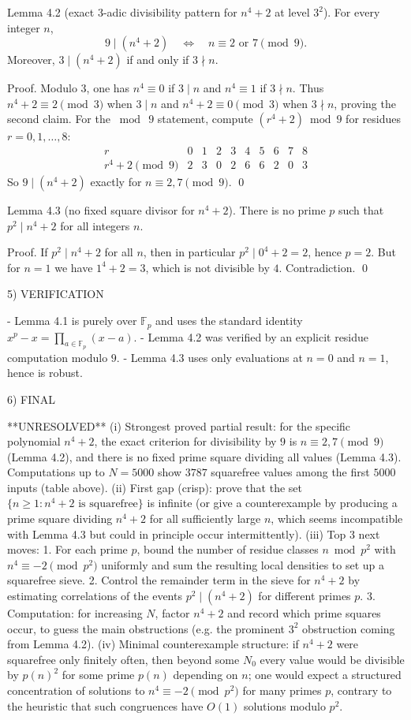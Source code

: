 Lemma 4.2 (exact $3$-adic divisibility pattern for $n^4+2$ at level $3^2$).
For every integer $n$,
\[
9\mid (n^4+2)\quad\Longleftrightarrow\quad n\equiv 2\text{ or }7\pmod 9.
\]
Moreover, $3\mid(n^4+2)$ if and only if $3\nmid n$.

Proof.
Modulo $3$, one has $n^4\equiv 0$ if $3\mid n$ and $n^4\equiv 1$ if $3\nmid n$.
Thus $n^4+2\equiv 2\pmod 3$ when $3\mid n$ and $n^4+2\equiv 0\pmod 3$ when $3\nmid n$, proving the second claim.
For the $\bmod\ 9$ statement, compute $(r^4+2)\bmod 9$ for residues $r=0,1,\dots,8$:
\[
\begin{array}{c|ccccccccc}
 r & 0&1&2&3&4&5&6&7&8\\\hline
 r^4+2\pmod 9 & 2&3&0&2&6&6&2&0&3
\end{array}
\]
So $9\mid (n^4+2)$ exactly for $n\equiv 2,7\pmod 9$. \qed

Lemma 4.3 (no fixed square divisor for $n^4+2$).
There is no prime $p$ such that $p^2\mid n^4+2$ for all integers $n$.

Proof.
If $p^2\mid n^4+2$ for all $n$, then in particular $p^2\mid 0^4+2=2$, hence $p=2$.
But for $n=1$ we have $1^4+2=3$, which is not divisible by $4$. Contradiction. \qed

5) VERIFICATION

- Lemma 4.1 is purely over $\mathbb F_p$ and uses the standard identity $x^p-x=\prod_{a\in\mathbb F_p}(x-a)$.
- Lemma 4.2 was verified by an explicit residue computation modulo $9$.
- Lemma 4.3 uses only evaluations at $n=0$ and $n=1$, hence is robust.

6) FINAL

**UNRESOLVED**
(i) Strongest proved partial result: for the specific polynomial $n^4+2$, the exact criterion for divisibility by $9$ is $n\equiv 2,7\pmod 9$ (Lemma 4.2), and there is no fixed prime square dividing all values (Lemma 4.3). Computations up to $N=5000$ show $3787$ squarefree values among the first $5000$ inputs (table above).
(ii) First gap (crisp): prove that the set $\{n\ge 1: n^4+2\text{ is squarefree}\}$ is infinite (or give a counterexample by producing a prime square dividing $n^4+2$ for all sufficiently large $n$, which seems incompatible with Lemma 4.3 but could in principle occur intermittently).
(iii) Top 3 next moves:
  1. For each prime $p$, bound the number of residue classes $n\bmod p^2$ with $n^4\equiv -2\pmod{p^2}$ uniformly and sum the resulting local densities to set up a squarefree sieve.
  2. Control the remainder term in the sieve for $n^4+2$ by estimating correlations of the events $p^2\mid(n^4+2)$ for different primes $p$.
  3. Computation: for increasing $N$, factor $n^4+2$ and record which prime squares occur, to guess the main obstructions (e.g. the prominent $3^2$ obstruction coming from Lemma 4.2).
(iv) Minimal counterexample structure: if $n^4+2$ were squarefree only finitely often, then beyond some $N_0$ every value would be divisible by $p(n)^2$ for some prime $p(n)$ depending on $n$; one would expect a structured concentration of solutions to $n^4\equiv -2\pmod{p^2}$ for many primes $p$, contrary to the heuristic that such congruences have $O(1)$ solutions modulo $p^2$.




